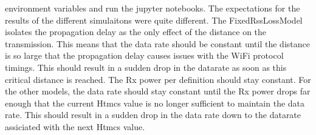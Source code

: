 environment variables and run the jupyter notebooks.
The expectations for the results of the different simulaitons were quite different.
The FixedRssLossModel isolates the propagation delay as the only effect of the distance on the transmission. This means 
that the data rate should be constant until the distance is so large that the propagation delay causes issues with the 
WiFi protocol timings. This should result in a sudden drop in the datarate as soon as this 
critical distance is reached. The Rx power per definition should stay constant.
For the other models, the data rate should stay constant until the Rx power drops far enough that the current Htmcs value is 
no longer sufficient to maintain the data rate. This should result in a sudden drop in the data rate down to the datarate assiciated with the 
next Htmcs value.